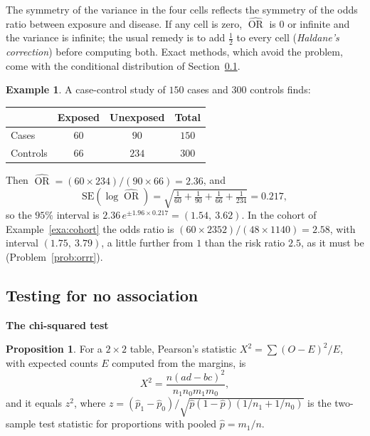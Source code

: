 \documentclass[11pt,a4paper]{article}
\numberwithin{equation}{section}
\DeclareMathOperator{\OR}{OR}
\theoremstyle{definition}
\newtheorem{exa}[thm]{Example}
\newtheorem{prop}[thm]{Proposition}
\newcommand{\subhead}[1]{%
  \par\medskip\noindent\textbf{#1}\par\nobreak\smallskip}
\begin{document}
The symmetry of the variance in the four cells reflects the symmetry of the odds ratio between exposure and disease. If any cell is
zero, $\widehat{\OR}$ is $0$ or infinite and the variance is infinite; the usual remedy is to add $\tfrac12$ to every cell
(\emph{Haldane's correction}) before computing both. Exact methods, which avoid the problem, come with the conditional distribution of
Section~\ref{sec:tests}.

\begin{exa}
\label{exa:casecontrol}
A case-control study of $150$ cases and $300$ controls finds:
\begin{center}
\begin{tabular}{l|cc|c}
 & Exposed & Unexposed & Total \\
\hline
Cases & $60$ & $90$ & $150$ \\
Controls & $66$ & $234$ & $300$ \\
\hline
\end{tabular}
\end{center}
Then $\widehat{\OR} = (60 \times 234)/(90 \times 66) = 2.36$, and
\[
\text{SE}(\log\widehat{\OR}) = \sqrt{\tfrac{1}{60} + \tfrac{1}{90} + \tfrac{1}{66} + \tfrac{1}{234}} = 0.217 ,
\]
so the $95\%$ interval is $2.36\,e^{\pm 1.96 \times 0.217} = (1.54,\ 3.62)$. In the cohort of Example~\ref{exa:cohort} the odds ratio is
$(60 \times 2352)/(48 \times 1140) = 2.58$, with interval $(1.75,\ 3.79)$, a little further from $1$ than the risk ratio $2.5$, as it must be
(Problem~\ref{prob:orrr}).
\end{exa}

\subsection{Testing for no association}
\label{sec:tests}

\subhead{The chi-squared test}

\begin{prop}
\label{prop:chisq}
For a $2 \times 2$ table, Pearson's statistic $X^2 = \sum (O - E)^2/E$, with expected counts $E$ computed from the margins, is
\[
X^2 = \frac{n(ad - bc)^2}{n_1 n_0 m_1 m_0} ,
\]
and it equals $z^2$, where $z = (\hat p_1 - \hat p_0)/\sqrt{\hat p(1 - \hat p)(1/n_1 + 1/n_0)}$ is the two-sample test statistic for proportions with pooled
$\hat p = m_1/n$.
\end{prop}
\end{document}
